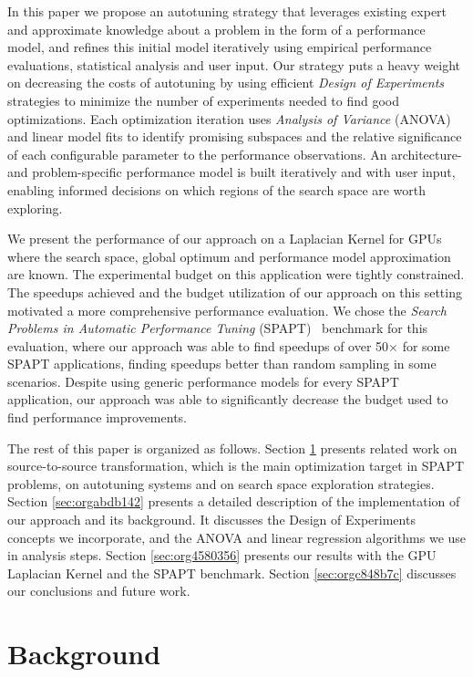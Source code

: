 \documentclass[conference]{IEEEtran}
\begin{document}
In this paper we propose an autotuning strategy that leverages existing expert
and approximate knowledge about a problem in the form of a performance model,
and refines this initial model iteratively using empirical performance
evaluations, statistical analysis and user input. Our strategy puts a heavy
weight on decreasing the costs of autotuning by using efficient \emph{Design of
Experiments} strategies to minimize the number of experiments needed to find
good optimizations. Each optimization iteration uses \emph{Analysis of Variance}
(ANOVA) and linear model fits to identify promising subspaces and the relative
significance of each configurable parameter to the performance observations. An
architecture- and problem-specific performance model is built iteratively and
with user input, enabling informed decisions on which regions of the search
space are worth exploring.

We present the performance of our approach on a Laplacian Kernel for GPUs where
the search space, global optimum and performance model approximation are known.
The experimental budget on this application were tightly constrained. The
speedups achieved and the budget utilization of our approach on this setting
motivated a more comprehensive performance evaluation. We chose the \emph{Search
Problems in Automatic Performance Tuning}
(SPAPT)~\cite{balaprakash2012spapt} benchmark for this evaluation, where
our approach was able to find speedups of over 50\(\times\) for some SPAPT
applications, finding speedups better than random sampling in some scenarios.
Despite using generic performance models for every SPAPT application, our
approach was able to significantly decrease the budget used to find performance
improvements.

The rest of this paper is organized as follows. Section \ref{sec:orgb9ebaf0} presents
related work on source-to-source transformation, which is the main optimization
target in SPAPT problems, on autotuning systems and on search space exploration
strategies. Section \ref{sec:orgabdb142} presents a
detailed description of the implementation of our approach and its background.
It discusses the Design of Experiments concepts we incorporate, and the ANOVA
and linear regression algorithms we use in analysis steps. Section \ref{sec:org4580356} presents our results with the GPU Laplacian Kernel and the SPAPT
benchmark. Section \ref{sec:orgc848b7c} discusses our conclusions and future work.
\section{Background}
\label{sec:orgb9ebaf0}
\end{document}
